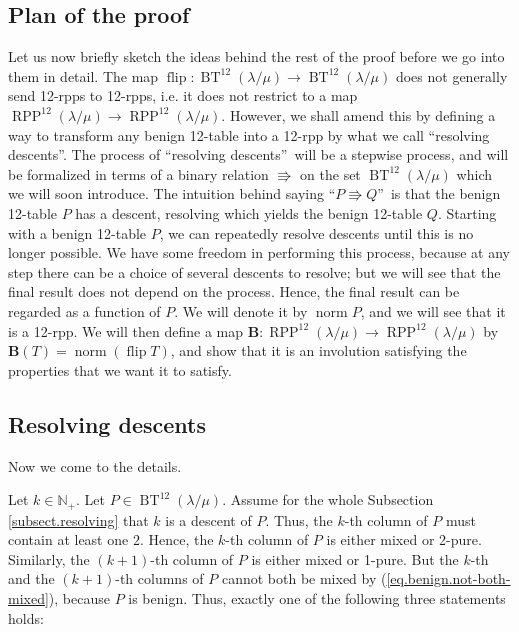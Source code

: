 \documentclass[12pt]{article}
\theoremstyle{plain}
\theoremstyle{definition}
\def\OneTwoRPP{{\operatorname{RPP}^{12}\left(  \lambda/\mu\right)}}
\def\BenignTables{{\operatorname{BT}^{12}\left(  \lambda/\mu\right)}}
\begin{document}
\subsection{Plan of the proof}

Let us now briefly sketch the ideas behind the rest of the proof before we go
into them in detail. The map $\operatorname*{flip}:\BenignTables\rightarrow
\BenignTables$ does not generally send 12-rpps to 12-rpps, i.e. it does not
restrict to a map $\OneTwoRPP\rightarrow\OneTwoRPP$. However, we shall amend
this by defining a way to transform any benign 12-table into a 12-rpp by what
we call \textquotedblleft resolving descents\textquotedblright. The process of
\textquotedblleft resolving descents\textquotedblright\ will be a stepwise
process, and will be formalized in terms of a binary relation $\Rrightarrow$
on the set $\BenignTables$ which we will soon introduce. The intuition behind
saying \textquotedblleft$P\Rrightarrow Q$\textquotedblright\ is that the
benign 12-table $P$ has a descent, resolving which yields the benign 12-table
$Q$. Starting with a benign 12-table $P$, we can repeatedly resolve descents
until this is no longer possible. We have some freedom in
performing this process, because at any step there can be a choice of several
descents to resolve; but we will see that the final result does not depend on
the process. Hence, the final result can be regarded as a function of $P$. We
will denote it by $\operatorname*{norm}P$, and we will see that it is a
12-rpp. We will then define a map $\mathbf{B}:\OneTwoRPP\rightarrow\OneTwoRPP$
by $\mathbf{B}\left(  T\right)  =\operatorname*{norm}\left(
\operatorname*{flip}T\right)  $, and show that it is an involution satisfying
the properties that we want it to satisfy.

\subsection{\label{subsect.resolving}Resolving descents}

Now we come to the details.

Let $k\in\mathbb{N}_{+}$. Let $P\in\BenignTables$. Assume for the whole Subsection \ref{subsect.resolving} that $k$
is a descent of $P$. Thus, the $k$-th column of $P$ must contain at least one
$2$. Hence, the $k$-th column of $P$ is either mixed or 2-pure. Similarly, the
$\left(  k+1\right)  $-th column of $P$ is either mixed or 1-pure. But the
$k$-th and the $\left(  k+1\right)  $-th columns of $P$ cannot both be mixed by (\ref{eq.benign.not-both-mixed}), because $P$ is benign. Thus,
exactly one of the following three statements holds:
\end{document}
